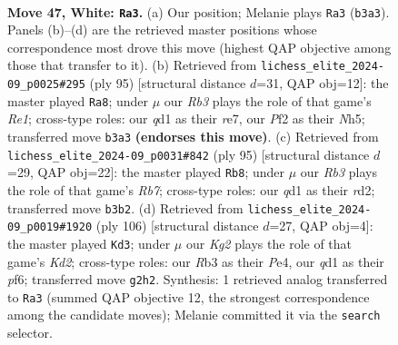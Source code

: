 \documentclass[11pt]{article}
\begin{document}
\clearpage

\begin{figure}[p]\centering
\begin{subfigure}{0.46\textwidth}\centering
\resizebox{\linewidth}{!}{%
\newchessgame
\chessboard[
  setfen={6k1/2r3p1/1p4N1/r2p4/P3p3/1R6/5PK1/3q4 w - - 2 47},
  showmover=false,
  pgfstyle=straightmove, color=movearrow, markmove={b3-a3}
]}
\caption{}
\end{subfigure}\hfill
\begin{subfigure}{0.46\textwidth}\centering
\resizebox{\linewidth}{!}{%
\newchessgame
\chessboard[
  setfen={4r3/P3R3/2p5/6kn/1P2P3/1K6/2P4p/6n1 b - - 1 48},
  showmover=false,
  pgfstyle=straightmove, color=movearrow, markmove={e8-a8}
]}
\caption{}
\end{subfigure}
\\[4pt]
\begin{subfigure}{0.46\textwidth}\centering
\resizebox{\linewidth}{!}{%
\newchessgame
\chessboard[
  setfen={8/8/5k2/3p1p2/3P3P/6P1/1r1R1P2/4K3 b - - 1 48},
  showmover=false,
  pgfstyle=straightmove, color=movearrow, markmove={b2-b8}
]}
\caption{}
\end{subfigure}\hfill
\begin{subfigure}{0.46\textwidth}\centering
\resizebox{\linewidth}{!}{%
\newchessgame
\chessboard[
  setfen={1R6/2pk4/2p2p2/1p6/2r1Pp2/5P2/3K4/8 w - - 2 54},
  showmover=false,
  pgfstyle=straightmove, color=movearrow, markmove={d2-d3}
]}
\caption{}
\end{subfigure}
\caption{\textbf{Move 47, White: \texttt{Ra3}.} (a) Our position; Melanie plays \texttt{Ra3} (\texttt{b3a3}). Panels (b)--(d) are the retrieved master positions whose correspondence most drove this move (highest QAP objective among those that transfer to it). (b) Retrieved from \texttt{lichess\_elite\_2024-09\_p0025\#295} (ply 95) [structural distance $d$=31, QAP obj=12]: the master played \texttt{Ra8}; under $\mu$ our \emph{Rb3} plays the role of that game's \emph{Re1}; cross-type roles: our \emph{q}d1 as their \emph{r}e7, our \emph{P}f2 as their \emph{N}h5; transferred move \texttt{b3a3} \textbf{(endorses this move)}. (c) Retrieved from \texttt{lichess\_elite\_2024-09\_p0031\#842} (ply 95) [structural distance $d$=29, QAP obj=22]: the master played \texttt{Rb8}; under $\mu$ our \emph{Rb3} plays the role of that game's \emph{Rb7}; cross-type roles: our \emph{q}d1 as their \emph{r}d2; transferred move \texttt{b3b2}. (d) Retrieved from \texttt{lichess\_elite\_2024-09\_p0019\#1920} (ply 106) [structural distance $d$=27, QAP obj=4]: the master played \texttt{Kd3}; under $\mu$ our \emph{Kg2} plays the role of that game's \emph{Kd2}; cross-type roles: our \emph{R}b3 as their \emph{P}e4, our \emph{q}d1 as their \emph{p}f6; transferred move \texttt{g2h2}. Synthesis: 1 retrieved analog transferred to \texttt{Ra3} (summed QAP objective 12, the strongest correspondence among the candidate moves); Melanie committed it via the \texttt{search} selector.}
\label{fig:thought-m92}
\end{figure}
\end{document}
